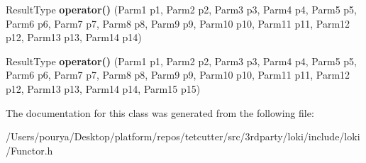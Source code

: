 \begin{DoxyCompactItemize}
\item 
\hypertarget{classLoki_1_1FunctorHandler_a916cf8a599e2a51431ee9d5eda63b7f0}{}Result\+Type {\bfseries operator()} (Parm1 p1, Parm2 p2, Parm3 p3, Parm4 p4, Parm5 p5, Parm6 p6, Parm7 p7, Parm8 p8, Parm9 p9, Parm10 p10, Parm11 p11, Parm12 p12, Parm13 p13, Parm14 p14)\label{classLoki_1_1FunctorHandler_a916cf8a599e2a51431ee9d5eda63b7f0}

\item 
\hypertarget{classLoki_1_1FunctorHandler_aca28679ffa7e799e3c5a0a610805d9e8}{}Result\+Type {\bfseries operator()} (Parm1 p1, Parm2 p2, Parm3 p3, Parm4 p4, Parm5 p5, Parm6 p6, Parm7 p7, Parm8 p8, Parm9 p9, Parm10 p10, Parm11 p11, Parm12 p12, Parm13 p13, Parm14 p14, Parm15 p15)\label{classLoki_1_1FunctorHandler_aca28679ffa7e799e3c5a0a610805d9e8}

\end{DoxyCompactItemize}


The documentation for this class was generated from the following file\+:\begin{DoxyCompactItemize}
\item 
/\+Users/pourya/\+Desktop/platform/repos/tetcutter/src/3rdparty/loki/include/loki/Functor.\+h\end{DoxyCompactItemize}

